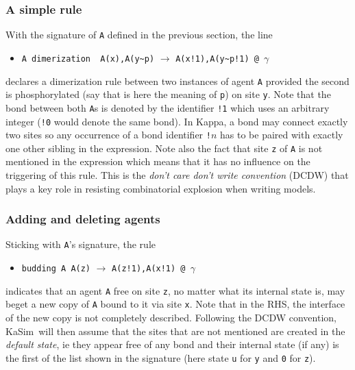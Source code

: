 \documentclass[11pt]{book}
\def\KaSim{\textsf{KaSim}}
\def\intstate{\textasciitilde}
\def\ttt#1{\texttt{#1}}
\def\var#1{{\textquotesingle}#1{\textquotesingle}}
\def\rar{\rightarrow}
\def\ga{\gamma}
\def\ie{ie }
\def\via{via }
\def\ITE#1{\begin{itemize}#1\end{itemize}}
\begin{document}
\subsubsection*{A simple rule}
With the signature of \ttt{A} defined in the previous section, the line
\ITE{
\item[] \ttt{{\textquotesingle}A dimerization\textquotesingle~  A(x),A(y\intstate p)} $\rar$ \ttt{A(x!1),A(y\intstate p!1) @ $\ga$} 
}
declares a dimerization rule between two instances of agent \ttt{A} provided the second is phosphorylated (say that is here the meaning of \ttt{p}) on site \ttt{y}. Note that the bond between both \ttt{A}s is denoted by the identifier \ttt{!1} which uses an arbitrary integer (\ttt{!0} would denote the same bond). In Kappa, a bond may connect exactly two sites so any occurrence of a bond identifier \ttt{!}$n$ has to be paired with exactly one other sibling in the expression. Note also the fact that site \ttt{z} of \ttt{A} is not mentioned in the expression which means that it has no influence on the triggering of this rule. This is the \emph{don't care don't write convention} (DCDW)  that plays a key role in resisting combinatorial explosion when writing models.

\subsubsection*{Adding and deleting agents}
Sticking with \ttt{A}'s signature, the rule
\ITE{
\item[] \ttt{\var{budding A}~A(z)} $\rar$ \ttt{A(z!1),A(x!1) @ $\ga$ } 
}
indicates that an agent \ttt{A} free on site \ttt{z}, no matter what its internal state is, may beget a new copy of \ttt{A} bound to it \via site \ttt{x}. Note that in the RHS, the interface of the new copy is not completely described. Following the DCDW convention, \KaSim~will then assume that the sites that are not mentioned are created in the \emph{default state}, \ie they appear free of any bond and their internal state (if any) is the first of the list shown in the signature (here state \ttt{u} for \ttt{y} and \ttt{0} for \ttt{z}).
\end{document}
